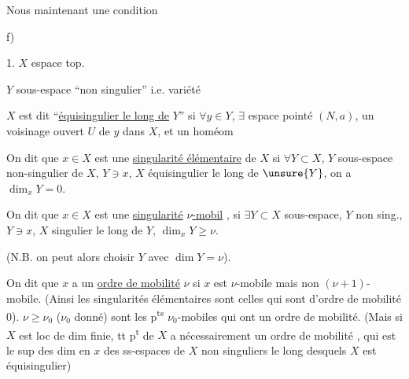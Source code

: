 Nous   maintenant une condition

f)

1. $X$ espace top.

$Y$ sous-espace ``non singulier'' i.e. variété

$X$ est dit ``\uline{équisingulier le long de} $Y$'' si $\forall y\in Y$,  $\exists$ espace pointé $(N,a)$,  un voisinage ouvert $U$ de $y$ dans $X$, et un homéom

On dit que $x\in X$ est une \uline{singularité élémentaire}  de $X$ si $\forall Y\subset X$, $Y$ sous-espace  non-singulier de $X$, $Y\ni x$, $X$ équisingulier  le long de $\unsure{Y}$, on a $\dim_xY=0$.

On dit que $x\in X$ est une \uline{singularité} \uline{$\nu$-mobil} , si $\exists Y\subset X$ sous-espace, $Y$ non sing., $Y\ni x$, $X$ singulier le long de $Y$, $\dim_xY\geq\nu$.

(N.B. on peut alors choisir $Y$ avec $\dim Y=\nu$).


On dit que $x$ a un \uline{ordre de mobilité} $\nu$ si $x$ est $\nu$-mobile mais non $(\nu+1)$-mobile. (Ainsi les singularités élémentaires  sont celles qui sont d'ordre de mobilité 0).    $\nu\geq\nu_0$ ($\nu_0$ donné) sont les p\textsuperscript{ts} $\nu_0$-mobiles qui ont un ordre de mobilité. (Mais si $X$  est loc de dim finie, tt p\textsuperscript{t}  de $X$ a nécessairement un ordre de mobilité , qui est le sup des dim en $x$ des ss-espaces de $X$  non singuliers  le long desquels $X$ est équisingulier)

